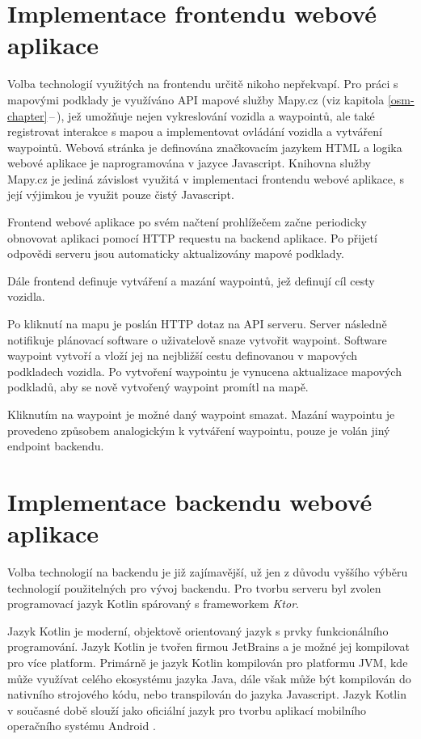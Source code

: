 \documentclass[czech, bachelor]{diploma}
\newcommand{\filipref}[1]{\ref{#1}\,--\,\nameref{#1}}
\begin{document}
\section{Implementace frontendu webové aplikace}

Volba technologií využitých na frontendu určitě nikoho nepřekvapí. Pro práci s mapovými podklady je využíváno API mapové služby
Mapy.cz (viz kapitola \filipref{osm-chapter}), jež umožňuje nejen vykreslování vozidla a waypointů, ale také registrovat interakce
s mapou a implementovat ovládání vozidla a vytváření waypointů. Webová stránka je definována značkovacím jazykem HTML a logika
webové aplikace je naprogramována v jazyce Javascript. Knihovna služby Mapy.cz je jediná závislost využitá v implementaci
frontendu webové aplikace, s její výjimkou je využit pouze čistý Javascript.

Frontend webové aplikace po svém načtení prohlížečem začne periodicky obnovovat aplikaci pomocí HTTP requestu na backend aplikace.
Po přijetí odpovědi serveru jsou automaticky aktualizovány mapové podklady.

Dále frontend definuje vytváření a mazání waypointů, jež definují cíl cesty vozidla.

Po kliknutí na mapu je poslán HTTP dotaz na API serveru. Server následně notifikuje plánovací software o uživatelově snaze
vytvořit waypoint. Software waypoint vytvoří a vloží jej na nejbližší cestu definovanou v mapových podkladech vozidla.
Po vytvoření waypointu je vynucena aktualizace mapových podkladů, aby se nově vytvořený waypoint promítl na mapě.

Kliknutím na waypoint je možné daný waypoint smazat. Mazání waypointu je provedeno způsobem analogickým k vytváření waypointu,
pouze je volán jiný endpoint backendu.

\section{Implementace backendu webové aplikace}

Volba technologií na backendu je již zajímavější, už jen z důvodu vyššího výběru technologií použitelných pro vývoj backendu.
Pro tvorbu serveru byl zvolen programovací jazyk Kotlin spárovaný s frameworkem \emph{Ktor}.

Jazyk Kotlin je moderní, objektově orientovaný jazyk s prvky funkcionálního programování. Jazyk Kotlin je tvořen firmou JetBrains
a je možné jej kompilovat pro více platform. Primárně je jazyk Kotlin kompilován pro platformu JVM, kde může využívat celého
ekosystému jazyka Java, dále však může být kompilován do nativního strojového kódu, nebo transpilován do jazyka Javascript. Jazyk
Kotlin v současné době slouží jako oficiální jazyk pro tvorbu aplikací mobilního operačního systému Android
\cite{kotlin-android-source}.
\end{document}
